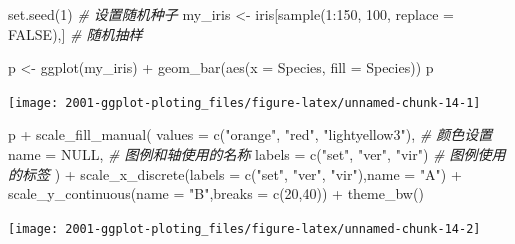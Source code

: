 \documentclass[
]{book}
\newenvironment{Shaded}{\begin{snugshade}}{\end{snugshade}}
\newcommand{\AttributeTok}[1]{\textcolor[rgb]{0.77,0.63,0.00}{#1}}
\newcommand{\CommentTok}[1]{\textcolor[rgb]{0.56,0.35,0.01}{\textit{#1}}}
\newcommand{\ConstantTok}[1]{\textcolor[rgb]{0.00,0.00,0.00}{#1}}
\newcommand{\DecValTok}[1]{\textcolor[rgb]{0.00,0.00,0.81}{#1}}
\newcommand{\FunctionTok}[1]{\textcolor[rgb]{0.00,0.00,0.00}{#1}}
\newcommand{\NormalTok}[1]{#1}
\newcommand{\OtherTok}[1]{\textcolor[rgb]{0.56,0.35,0.01}{#1}}
\newcommand{\SpecialCharTok}[1]{\textcolor[rgb]{0.00,0.00,0.00}{#1}}
\newcommand{\StringTok}[1]{\textcolor[rgb]{0.31,0.60,0.02}{#1}}
\begin{document}
\begin{Shaded}
\begin{Highlighting}[]
\FunctionTok{set.seed}\NormalTok{(}\DecValTok{1}\NormalTok{)  }\CommentTok{\# 设置随机种子}
\NormalTok{my\_iris }\OtherTok{\textless{}{-}}\NormalTok{ iris[}\FunctionTok{sample}\NormalTok{(}\DecValTok{1}\SpecialCharTok{:}\DecValTok{150}\NormalTok{, }\DecValTok{100}\NormalTok{, }\AttributeTok{replace =} \ConstantTok{FALSE}\NormalTok{),]  }\CommentTok{\# 随机抽样}

\NormalTok{p }\OtherTok{\textless{}{-}} \FunctionTok{ggplot}\NormalTok{(my\_iris) }\SpecialCharTok{+} 
  \FunctionTok{geom\_bar}\NormalTok{(}\FunctionTok{aes}\NormalTok{(}\AttributeTok{x =}\NormalTok{ Species, }\AttributeTok{fill =}\NormalTok{ Species))}
\NormalTok{p}
\end{Highlighting}
\end{Shaded}

\begin{center}\texttt{[image: 2001-ggplot-ploting\_files/figure-latex/unnamed-chunk-14-1]} \end{center}

\begin{Shaded}
\begin{Highlighting}[]
\NormalTok{p }\SpecialCharTok{+} \FunctionTok{scale\_fill\_manual}\NormalTok{(}
    \AttributeTok{values =} \FunctionTok{c}\NormalTok{(}\StringTok{"orange"}\NormalTok{, }\StringTok{"red"}\NormalTok{, }\StringTok{"lightyellow3"}\NormalTok{),  }\CommentTok{\# 颜色设置}
    \AttributeTok{name =} \ConstantTok{NULL}\NormalTok{,  }\CommentTok{\# 图例和轴使用的名称}
    \AttributeTok{labels =} \FunctionTok{c}\NormalTok{(}\StringTok{"set"}\NormalTok{, }\StringTok{"ver"}\NormalTok{, }\StringTok{"vir"}\NormalTok{)  }\CommentTok{\# 图例使用的标签}
\NormalTok{)  }\SpecialCharTok{+} 
  \FunctionTok{scale\_x\_discrete}\NormalTok{(}\AttributeTok{labels =} \FunctionTok{c}\NormalTok{(}\StringTok{"set"}\NormalTok{, }\StringTok{"ver"}\NormalTok{, }\StringTok{"vir"}\NormalTok{),}\AttributeTok{name =} \StringTok{"A"}\NormalTok{) }\SpecialCharTok{+}
  \FunctionTok{scale\_y\_continuous}\NormalTok{(}\AttributeTok{name =} \StringTok{"B"}\NormalTok{,}\AttributeTok{breaks =} \FunctionTok{c}\NormalTok{(}\DecValTok{20}\NormalTok{,}\DecValTok{40}\NormalTok{)) }\SpecialCharTok{+}
  \FunctionTok{theme\_bw}\NormalTok{()}
\end{Highlighting}
\end{Shaded}

\begin{center}\texttt{[image: 2001-ggplot-ploting\_files/figure-latex/unnamed-chunk-14-2]} \end{center}
\end{document}
